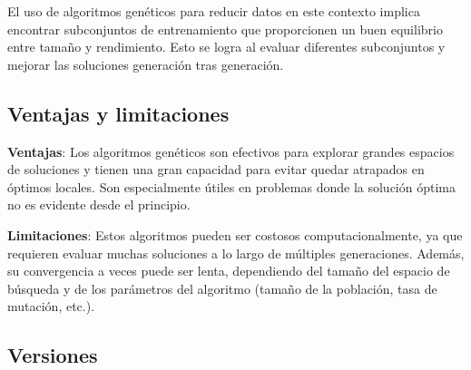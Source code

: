 El uso de algoritmos genéticos para reducir datos en este contexto implica encontrar subconjuntos de entrenamiento que
proporcionen un buen equilibrio entre tamaño y rendimiento.
Esto se logra al evaluar diferentes subconjuntos y mejorar las soluciones generación tras generación.

\subsection{Ventajas y limitaciones}\label{subsec:ventajas-y-limitaciones2}
\textbf{Ventajas}: Los algoritmos genéticos son efectivos para explorar grandes espacios de soluciones y tienen una
gran capacidad para evitar quedar atrapados en óptimos locales.
Son especialmente útiles en problemas donde la solución óptima no es evidente desde el principio.


\textbf{Limitaciones}: Estos algoritmos pueden ser costosos computacionalmente, ya que requieren evaluar muchas
soluciones a lo largo de múltiples generaciones.
Además, su convergencia a veces puede ser lenta, dependiendo del tamaño del espacio de búsqueda y de los
parámetros del algoritmo (tamaño de la población, tasa de mutación, etc.).

\subsection{Versiones}\label{subsec:versiones}
